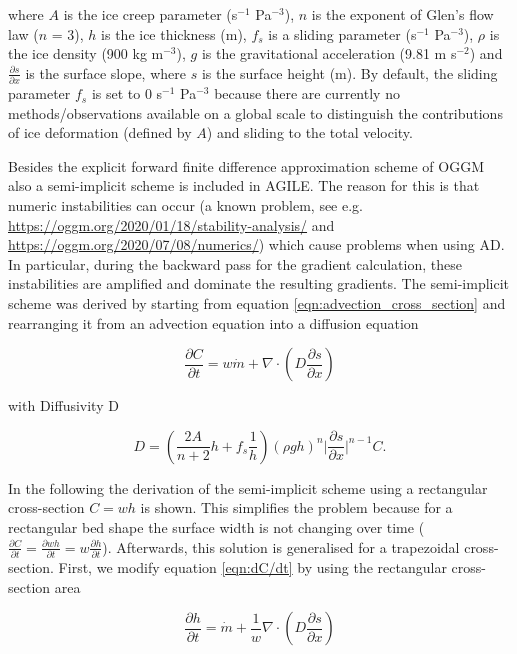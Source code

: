 \documentclass[journal abbreviation, manuscript]{copernicus}
\begin{document}
\noindent where $A$ is the ice creep parameter (s$^{-1}$ Pa$^{-3}$), $n$ is the exponent of Glen's flow law ($n$ = 3), $h$ is the ice thickness (m), $f_s$ is a sliding parameter (s$^{-1}$ Pa$^{-3}$), $\rho$ is the ice density (900 kg m$^{-3}$), $g$ is the gravitational acceleration (9.81 m s$^{-2}$) and $\frac{\partial s}{\partial x}$ is the surface slope, where $s$ is the surface height (m). By default, the sliding parameter $f_s$ is set to 0 s$^{-1}$ Pa$^{-3}$ because there are currently no methods/observations available on a global scale to distinguish the contributions of ice deformation (defined by $A$) and sliding to the total velocity.

Besides the explicit forward finite difference approximation scheme of OGGM also a semi-implicit scheme is included in AGILE. The reason for this is that numeric instabilities can occur (a known problem, see e.g. \url{https://oggm.org/2020/01/18/stability-analysis/} and \url{https://oggm.org/2020/07/08/numerics/}) which cause problems when using AD. In particular, during the backward pass for the gradient calculation, these instabilities are amplified and dominate the resulting gradients. The semi-implicit scheme was derived by starting from equation \ref{eqn:advection_cross_section} and rearranging it from an advection equation into a diffusion equation

\begin{equation}\label{eqn:dC/dt}
    \frac{\partial C}{\partial t} = w \Dot{m} + \nabla \cdot (D\frac{\partial s}{\partial x})
\end{equation}

\noindent with Diffusivity D

\begin{equation}\label{eqn:diffusivitiy_with_C}
    D = \left(\frac{2 A}{n + 2} h + f_s \frac{1}{h} \right) (\rho g h)^n \lvert \frac{\partial s}{\partial x} \rvert^{n - 1} C.
\end{equation}

In the following the derivation of the semi-implicit scheme using a rectangular cross-section $C = wh$ is shown. This simplifies the problem because for a rectangular bed shape the surface width is not changing over time ($\frac{\partial C}{\partial t} = \frac{\partial wh}{\partial t} = w\frac{\partial h}{\partial t}$). Afterwards, this solution is generalised for a trapezoidal cross-section. First, we modify equation \ref{eqn:dC/dt} by using the rectangular cross-section area

\begin{equation}\label{eqn:dh/dt}
    \frac{\partial h}{\partial t} = \Dot{m} + \frac{1}{w} \nabla \cdot (D\frac{\partial s}{\partial x})
\end{equation}
\end{document}
